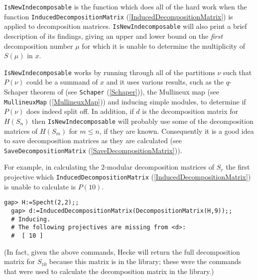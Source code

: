 \documentclass[a4paper,11pt]{report}
\begin{document}
{{{ \texttt{IsNewIndecomposable} is the function which does all of the hard work when the function \texttt{InducedDecompositionMatrix} (\ref{InducedDecompositionMatrix}) is applied to decomposition matrices. \texttt{IsNewIndecomposable} will also print a brief description of its findings, giving an upper and lower
bound on the \emph{first} decomposition number $\mu$ for which it is unable to determine the multiplicity of $S(\mu)$ in $x$.

 \texttt{IsNewIndecomposable} works by running through all of the partitions $\nu$ such that $P(\nu)$ could be a summand of $x$ and it uses various results, such as the $q$-Schaper theorem of \cite{JM2} (see \texttt{Schaper} (\ref{Schaper})), the Mullineux map (see \texttt{MullineuxMap} (\ref{MullineuxMap})) and inducing simple modules, to determine if $P(\nu)$ does indeed split off. In addition, if $d$ is the decomposition matrix for $H(S_n)$ then \texttt{IsNewIndecomposable} will probably use some of the decomposition matrices of $H(S_m)$ for $m\leq n$, if they are known. Consequently it is a good idea to save decomposition
matrices as they are calculated (see \texttt{SaveDecompositionMatrix} (\ref{SaveDecompositionMatrix})).

 For example, in calculating the $2$-modular decomposition matrices of $S_{r}$ the first projective which \texttt{InducedDecompositionMatrix} (\ref{InducedDecompositionMatrix}) is unable to calculate is $P(10)$. 
\begin{Verbatim}[fontsize=\small,frame=single,label=Example]
  gap> H:=Specht(2,2);;
  gap> d:=InducedDecompositionMatrix(DecompositionMatrix(H,9));;
  # Inducing.
  # The following projectives are missing from <d>:
  #  [ 10 ]
\end{Verbatim}
 (In fact, given the above commands, \textsf{Hecke} will return the full decomposition matrix for $S_{10}$ because this matrix is in the library; these were the commands that were used
to calculate the decomposition matrix in the library.)

}}}
\end{document}
